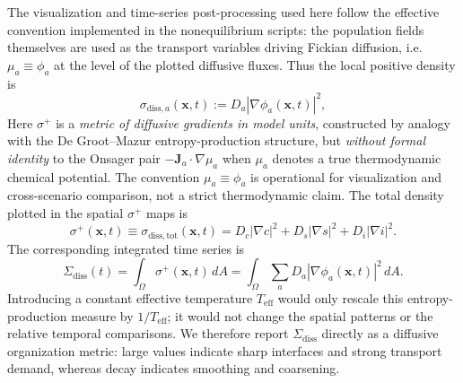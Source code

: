 The visualization and time-series post-processing used here follow the effective convention implemented in the nonequilibrium scripts: the population fields themselves are used as the transport variables driving Fickian diffusion, i.e. $\mu_a\equiv\phi_a$ at the level of the plotted diffusive fluxes. Thus the local positive density is
\begin{equation}
    \sigma_{\mathrm{diss},a}(\mathbf{x},t)
    :=D_a\left|\nabla\phi_a(\mathbf{x},t)\right|^2,
    \label{eq:sigma-diss-field}
\end{equation}
Here $\sigma^+$ is a \emph{metric of diffusive gradients in model units}, constructed by analogy with the De Groot--Mazur entropy-production structure, but \emph{without formal identity} to the Onsager pair $-\mathbf{J}_a\cdot\nabla\mu_a$ when $\mu_a$ denotes a true thermodynamic chemical potential. The convention $\mu_a\equiv\phi_a$ is operational for visualization and cross-scenario comparison, not a strict thermodynamic claim.
The total density plotted in the spatial $\sigma^+$ maps is
\begin{equation}
    \sigma^+(\mathbf{x},t)
    \equiv\sigma_{\mathrm{diss,tot}}(\mathbf{x},t)
    =D_c|\nabla c|^2+D_s|\nabla s|^2+D_i|\nabla i|^2 .
    \label{eq:sigma-plus-density}
\end{equation}
The corresponding integrated time series is
\begin{equation}
    \Sigma_{\mathrm{diss}}(t)
    =\int_\Omega \sigma^+(\mathbf{x},t)\,dA
    =\int_{\Omega}\sum_a D_a
    \left|\nabla \phi_a(\mathbf{x},t)\right|^2\,dA .
    \label{eq:sigma-diss-integral}
\end{equation}
Introducing a constant effective temperature $T_{\mathrm{eff}}$ would only rescale this entropy-production measure by $1/T_{\mathrm{eff}}$; it would not change the spatial patterns or the relative temporal comparisons. We therefore report $\Sigma_{\mathrm{diss}}$ directly as a diffusive organization metric: large values indicate sharp interfaces and strong transport demand, whereas decay indicates smoothing and coarsening.

